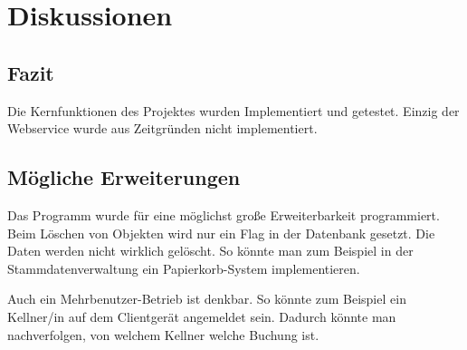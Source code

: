 \section{Diskussionen}

\subsection{Fazit}

Die Kernfunktionen des Projektes wurden Implementiert und getestet. Einzig der Webservice wurde aus Zeitgründen nicht implementiert. 

\subsection{Mögliche Erweiterungen}

Das Programm wurde für eine möglichst große Erweiterbarkeit programmiert. Beim Löschen von Objekten wird nur ein Flag in der Datenbank gesetzt. Die Daten werden nicht wirklich gelöscht. So könnte man zum Beispiel in der Stammdatenverwaltung ein Papierkorb-System implementieren.

Auch ein Mehrbenutzer-Betrieb ist denkbar. So könnte zum Beispiel ein Kellner/in auf dem Clientgerät angemeldet sein. Dadurch könnte man nachverfolgen, von welchem Kellner welche Buchung ist.